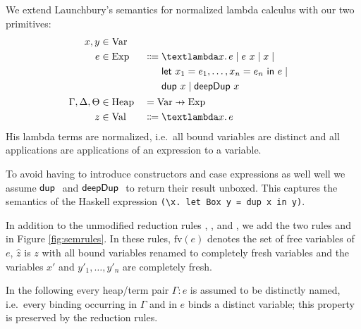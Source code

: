 \documentclass[preprint]{sigplanconf}
\newcommand\pfun{\mathrel{\ooalign{\hfil$\mapstochar\mkern5mu$\hfil\cr$\to$\cr}}}
\theoremstyle{nonumberplain}
\newcommand{\li}{\lstinline[style=Haskell]}
\begin{document}
We extend Launchbury’s semantics for normalized lambda calculus with our two primitives:
\newcommand{\mdup}{\text{\textsf{dup}}}
\newcommand{\mdeepDup}{\text{\textsf{deepDup}}}
\newcommand{\sVar}{\text{Var}}
\newcommand{\sExp}{\text{Exp}}
\newcommand{\sHeap}{\text{Heap}}
\newcommand{\sVal}{\text{Val}}
\newcommand{\sValue}{\text{Value}}
\newcommand{\sEnv}{\text{Env}}
\newcommand{\sApp}[2]{#1\ #2}
\newcommand{\sLam}[2]{\text{\textlambda} #1.\, #2}
\newcommand{\sDup}[1]{\sApp \mdup #1}
\newcommand{\sDeepDup}[1]{\sApp \mdeepDup #1}
\newcommand{\sLet}[2]{\text{\textsf{let}}\ #1\ \text{\textsf{in}}\ #2}
\newcommand{\sred}[4]{#1 : #2 \Downarrow #3 : #4}
\newcommand{\sRule}[1]{\text{{\textsc{#1}}}}
\newcommand{\fv}[1]{\text{fv}(#1)}
\newcommand{\ufv}[1]{\text{ufv}(#1)}
\newcommand{\ur}[2]{\text{ur}_{#1}(#2)}
\newcommand{\dom}[1]{\text{dom}\,#1}
\newcommand{\fresh}[1]{#1'}
\begin{alignat*}{2}
x,y &\in \sVar \\
e &\in
\sExp &&\Coloneqq
\begin{aligned}[t]&
\sLam x e
\mid \sApp e x
\mid x \mid
\\&
\sLet {x_1 = e_1,\ldots,x_n = e_n} e \mid
\\&
\sDup x \mid \sDeepDup x
\end{aligned}\\
\Gamma, \Delta, \Theta &\in \sHeap &&= \sVar \pfun \sExp \\
z &\in \sVal &&\Coloneqq \sLam x e
\end{alignat*}
His lambda terms are normalized, i.e.\ all bound variables are distinct and all applications are applications of an expression to a variable.

To avoid having to introduce constructors and case expressions as well well we assume $\sDup$ and $\sDeepDup$ to return their result unboxed. This captures the semantics of the Haskell expression \li!(\x. let Box y = dup x in y)!.

In addition to the unmodified reduction rules \sRule{Lam}, \sRule{App}, \sRule{Var} and \sRule{Let}, we add the two rules \sRule{Dup} and \sRule{Deep} in Figure \ref{fig:semrules}. In these rules, $\fv e$ denotes the set of free variables of $e$, $\hat z$ is $z$ with all bound variables renamed to completely fresh variables and the variables $\fresh x$ and $\fresh y_1,\ldots,\fresh y_n$ are completely fresh.

In the following every heap/term pair $\Gamma : e$ is assumed to be distinctly named, i.e.\ every binding occurring in $\Gamma$ and in $e$ binds a distinct variable; this property is preserved by the reduction rules.
\end{document}
